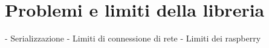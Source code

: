 \section{Problemi e limiti della libreria}
- Serializzazione
- Limiti di connessione di rete
- Limiti dei raspberry